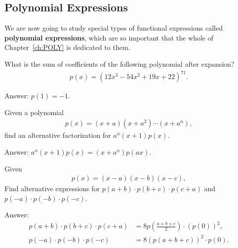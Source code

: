 \documentclass[12pt,a4paper]{memoir}
\theoremstyle{definition}
\begin{document}
\newpage
\subsection{Polynomial Expressions}
We are now going to study special types of functional expressions called \textbf{polynomial expressions}, which are so important that the whole of Chapter~\ref{ch:POLY} is dedicated to them.

\begin{tcolorbox}
	\begin{question}
		What is the sum of coefficients of the following polynomial after expansion?
		\begin{align*}
			p(x)=(12x^3-54x^2+19x+22)^{71}.
		\end{align*}
	\end{question}
\end{tcolorbox}

\begin{solution}[name=Solution by Parviz Shahriari]
	Answer: $p(1)=-1$.
\end{solution}



\begin{tcolorbox}
	\begin{question}
		Given a polynomial
		\begin{align*}
			p(x)=(x+a)(x+a^2)\cdots (x+a^n),
		\end{align*}
		find an alternative factorization for $a^n(x+1)p(x)$.
	\end{question}
\end{tcolorbox}

\begin{solution}[name=Solution by Parviz Shahriari]
	Answer: $a^n(x+1)p(x) = (x+a^n)p(ax)$.
\end{solution}



\begin{tcolorbox}
	\begin{question}
		Given
		\begin{align*}
			p(x) = (x-a)(x-b)(x-c),
		\end{align*}
		Find alternative expressions for $p(a+b)\cdot p(b+c) \cdot p(c+a)$ and $p(-a)\cdot p(-b) \cdot p(-c)$.
	\end{question}
\end{tcolorbox}

\begin{solution}[name=Solution by Parviz Shahriari]
	Answer: 
	\begin{align*}
		p(a+b)\cdot p(b+c) \cdot p(c+a) &= 8 p\left(\frac{a+b+c}{2}\right) \cdot \left(p(0)\right)^2,\\
		p(-a)\cdot p(-b) \cdot p(-c) &= 8\left(p(a+b+c)\right)^2\cdot p(0).
	\end{align*}
\end{solution}
\end{document}
